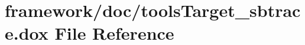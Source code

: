 \hypertarget{tools_target__sbtrace_8dox}{}\section{framework/doc/tools\+Target\+\_\+sbtrace.dox File Reference}
\label{tools_target__sbtrace_8dox}
